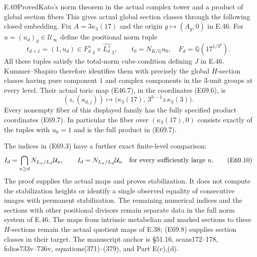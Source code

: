 \begin{statement}{E.69}{Proved}{Kato's norm theorem in the actual complex tower and a product of global section fibers}
This gives actual global section classes through the following
closed embedding. Fix $A=3\kappa_3(17)$ and the origin
$g\mapsto(A_g,0)$ in E.46. For $u=(u_d)_d\in\mathcal U_\infty$
define the positional norm tuple
\[
 t_{d+1}=(1,u_d)\in
       \widehat{F_d^\times}_3\times\widehat{L_d^\times}_3,
 \qquad t_0=N_{K/\mathbb Q}u_0,
 \quad F_d=\mathbb Q(17^{1/3^d}).
 \tag{E69.8}
\]
All these tuples satisfy the total-norm cube condition defining
$J$ in E.46. Kummer--Shapiro therefore identifies them with precisely
the global $H$-section classes having pure component $1$ and complex
components in the $3$-unit groups at every level.
Their actual toric map (E46.7), in the coordinates (E69.6), is
\[
          (z,(a_{d,j}))\longmapsto
      \bigl(\kappa_3(17),\,
                   3^{h-1}z\,\kappa_3(3)\bigr).
 \tag{E69.9}
\]
Every nonempty fiber of this displayed family has the fully specified
product coordinates (E69.7).
In particular the fiber over $(\kappa_3(17),0)$ consists exactly
of the tuples with $u_0=1$ and is the full product in (E69.7).

The indices in (E69.3) have a further exact finite-level comparison:
\[
 I_d=\bigcap_{n\ge d}N_{L_n/L_d}\mathcal U_n,
 \qquad
 I_d=N_{L_n/L_d}\mathcal U_n
                 \quad\hbox{for every sufficiently large }n.
 \tag{E69.10}
\]
The proof supplies the actual maps and proves stabilization.
It does not compute the stabilization heights or identify a single
observed equality of consecutive images with permanent stabilization.
The remaining numerical indices and the sections with other
positional divisors remain separate data in the full norm system
of E.46. The maps from intrinsic metabelian and marked sections
to these $H$-sections remain the actual quotient maps of E.38;
(E69.8) supplies section classes in their target.
The manuscript anchor is \S51.16, scans172--178,
folios733v--736v, equations(371)--(379), and Part E(c),(d).
\end{statement}

